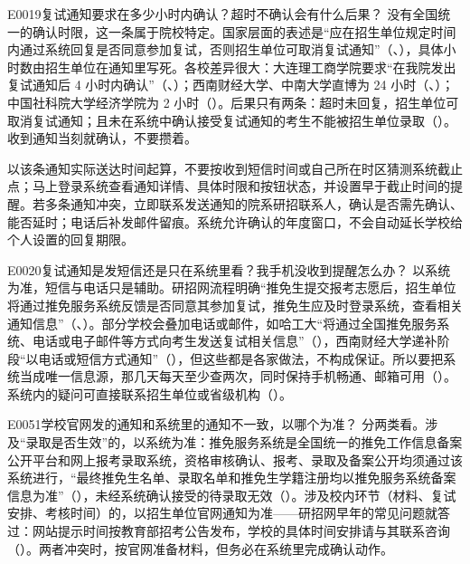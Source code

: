 \begin{qa}{E0019}{复试通知要求在多少小时内确认？超时不确认会有什么后果？}
没有全国统一的确认时限，这一条属于院校特定。国家层面的表述是“应在招生单位规定时间内通过系统回复是否同意参加复试，否则招生单位可取消复试通知”（、），具体小时数由招生单位在通知里写死。各校差异很大：大连理工商学院要求“在我院发出复试通知后 4 小时内确认”（、）；西南财经大学、中南大学直博为 24 小时（、）；中国社科院大学经济学院为 2 小时（）。后果只有两条：超时未回复，招生单位可取消复试通知；且未在系统中确认接受复试通知的考生不能被招生单位录取（）。收到通知当刻就确认，不要攒着。

以该条通知实际送达时间起算，不要按收到短信时间或自己所在时区猜测系统截止点；马上登录系统查看通知详情、具体时限和按钮状态，并设置早于截止时间的提醒。若多条通知冲突，立即联系发送通知的院系研招联系人，确认是否需先确认、能否延时；电话后补发邮件留痕。系统允许确认的年度窗口，不会自动延长学校给个人设置的回复期限。
\end{qa}

\begin{qa}{E0020}{复试通知是发短信还是只在系统里看？我手机没收到提醒怎么办？}
以系统为准，短信与电话只是辅助。研招网流程明确“推免生提交报考志愿后，招生单位将通过推免服务系统反馈是否同意其参加复试，推免生应及时登录系统，查看相关通知信息”（、）。部分学校会叠加电话或邮件，如哈工大“将通过全国推免服务系统、电话或电子邮件等方式向考生发送复试相关信息”（），西南财经大学递补阶段“以电话或短信方式通知”（），但这些都是各家做法，不构成保证。所以要把系统当成唯一信息源，那几天每天至少查两次，同时保持手机畅通、邮箱可用（）。系统内的疑问可直接联系招生单位或省级机构（）。
\end{qa}

\begin{qa}{E0051}{学校官网发的通知和系统里的通知不一致，以哪个为准？}
分两类看。涉及“录取是否生效”的，以系统为准：推免服务系统是全国统一的推免工作信息备案公开平台和网上报考录取系统，资格审核确认、报考、录取及备案公开均须通过该系统进行，“最终推免生名单、录取名单和推免生学籍注册均以推免服务系统备案信息为准”（），未经系统确认接受的待录取无效（）。涉及校内环节（材料、复试安排、考核时间）的，以招生单位官网通知为准——研招网早年的常见问题就答过：网站提示时间按教育部招考公告发布，学校的具体时间安排请与其联系咨询（）。两者冲突时，按官网准备材料，但务必在系统里完成确认动作。
\end{qa}

